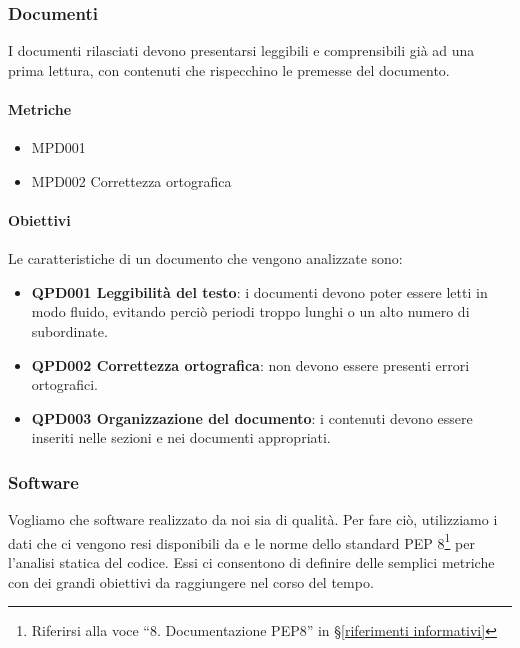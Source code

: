 	\subsubsection{Documenti}
	I documenti rilasciati devono presentarsi leggibili e comprensibili già ad una prima lettura, con contenuti che rispecchino le premesse del documento.

		\paragraph{Metriche}
		\begin{itemize}
			\item MPD001 
			\item MPD002 Correttezza ortografica
		\end{itemize}

		\paragraph{Obiettivi}
		Le caratteristiche di un documento che vengono analizzate sono:

		\begin{itemize}
			\item \textbf{QPD001 Leggibilità del testo}: i documenti devono poter essere letti in modo fluido, evitando perciò periodi troppo lunghi o un alto numero di subordinate.
			\item \textbf{QPD002 Correttezza ortografica}: non devono essere presenti errori ortografici.
			\item \textbf{QPD003 Organizzazione del documento}: i contenuti devono essere inseriti nelle sezioni e nei documenti appropriati.
		\end{itemize}

	\subsubsection{Software} \label{prodottosw}
	Vogliamo che software realizzato da noi sia di qualità.
	Per fare ciò, utilizziamo i dati che ci vengono resi disponibili da  e le norme dello standard PEP 8\footnote{Riferirsi alla voce ``8. Documentazione PEP8'' in \S\ref{riferimenti informativi}} per l'analisi statica del codice.
	Essi ci consentono di definire delle semplici metriche con dei grandi obiettivi da raggiungere nel corso del tempo.

